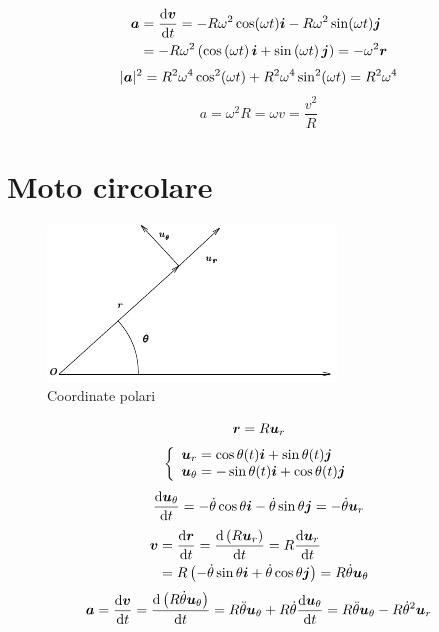 \begin{align*}
\boldsymbol{a}&=\frac{\mathrm{d}\boldsymbol{v}}{\mathrm{d} t}=-R\omega^2\cos(\omega t)\boldsymbol{i}-R\omega^2\sin(\omega t)\boldsymbol{j}\\
&=-R\omega^2\left(\cos\left(\omega t\right)\boldsymbol{i}+
\sin\left(\omega t\right)\boldsymbol{j}\right)=-\omega^2\boldsymbol{r}
\end{align*}
\begin{equation*}|\boldsymbol{a}|^2=R^2\omega^4\cos^2(\omega t)+R^2\omega^4\sin^2(\omega
t)=R^2\omega^4\end{equation*}
\begin{equation*}a=\omega^2R=\omega v=\frac{v^2}{R}\end{equation*}
\section{Moto circolare}
\begin{figure}[htbp]
\centering
\includegraphics[scale=1]{immagini/fisica1/CorPol}
\caption{Coordinate polari}
\end{figure}
\begin{equation*}\boldsymbol{r}=R\boldsymbol{u}_r\end{equation*}
\begin{equation*}
\left\{\begin{array}{ll}
\boldsymbol{u}_r=\cos\theta(t)\boldsymbol{i}+\sin\theta(t)\boldsymbol{j}\\
\boldsymbol{u}_\theta=-\sin\theta(t)\boldsymbol{i}+\cos\theta(t)\boldsymbol{j}
\end{array}\right.
\end{equation*}
\begin{equation*}\frac{\mathrm{d}\boldsymbol{u}_\theta}{\mathrm{d} t}=-\dot{\theta}\cos\theta\boldsymbol{i}-\dot{\theta}\sin\theta\boldsymbol{j}=-\dot{\theta}\boldsymbol{u}_r\end{equation*}
\begin{align*}
\boldsymbol{v}&=\frac{\mathrm{d} \boldsymbol{r}}{\mathrm{d} t}=\frac{\mathrm{d}\left(R\boldsymbol{u}_r\right)}{\mathrm{d} t}=R\frac{\mathrm{d} \boldsymbol{u}_r}{\mathrm{d}
t}\\
&=R\left(-\dot\theta\sin\theta\boldsymbol{i}+\dot\theta\cos\theta\boldsymbol{j}\right)=R\dot\theta\boldsymbol{u}_\theta
\end{align*}
\[\boldsymbol{a}=\frac{\mathrm{d}\boldsymbol{v}}{\mathrm{d} t}=\frac{\mathrm{d}\left(R\dot\theta\boldsymbol{u}_\theta\right)}{\mathrm{d} t}=R\ddot\theta\boldsymbol{u}_\theta+R\dot\theta\frac{\mathrm{d}\boldsymbol{u}_\theta}{\mathrm{d}
t}=R\ddot\theta\boldsymbol{u}_\theta-R\dot\theta^2\boldsymbol{u}_r\]


